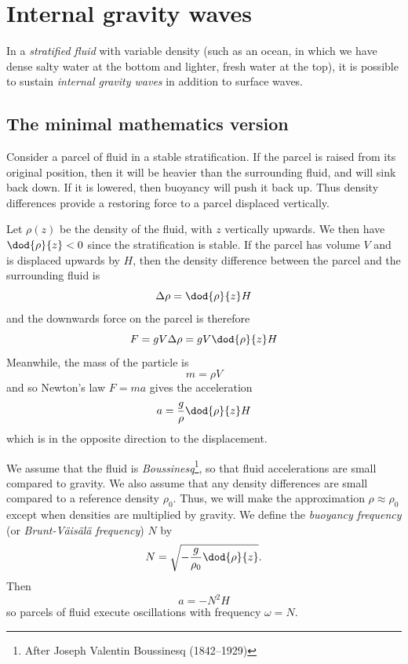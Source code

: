 \newpage
\chapter{Internal gravity waves} \label{section1}

In a \textit{stratified fluid} with variable density (such as an ocean, in which
we have dense salty water at the bottom and lighter, fresh water at the top), it
is possible to sustain \textit{internal gravity waves} in addition to surface
waves.

\section{The minimal mathematics version}

Consider a parcel of fluid in a stable stratification. If the parcel is raised
from its original position, then it will be heavier than the surrounding fluid,
and will sink back down. If it is lowered, then buoyancy will push it back up.
Thus density differences provide a restoring force to a parcel displaced
vertically. 

Let $\rho(z)$ be the density of the fluid, with $z$ vertically upwards. We then
have $\dod{\rho}{z} < 0$ since the stratification is stable. If the parcel has
volume $V$ and is displaced upwards by $H$, then the density difference between
the parcel and the surrounding fluid is 
\begin{equation}
	\Delta\rho = \dod{\rho}{z} H
\end{equation}
and the downwards force on the parcel is therefore
\begin{equation}
	F = gV\Delta\rho = gV\dod{\rho}{z}H
\end{equation}
Meanwhile, the mass of the particle is 
\begin{equation}
	m = \rho V
\end{equation}
and so Newton's law $F = ma$ gives the acceleration
\begin{equation}
	a = \frac{g}{\rho}\dod{\rho}{z} H
\end{equation}
which is in the opposite direction to the displacement.

We assume that the fluid is \textit{Boussinesq}\footnote{After Joseph Valentin
Boussinesq (1842--1929)}, so that fluid accelerations are
small compared to gravity. We also assume that any density differences are small
compared to a reference density $\rho_0$. Thus, we will make the approximation
$\rho\approx\rho_0$ except when densities are multiplied by gravity. We define
the \textit{buoyancy frequency} (or \textit{Brunt-V\"ais\"al\"a frequency}) $N$
by
\begin{equation}
    N = \sqrt{-\frac{g}{\rho_0}\dod{\rho}{z}}.
\end{equation}
Then 
\begin{equation}
	a = -N^2 H
\end{equation}
so parcels of fluid execute oscillations with frequency $\omega = N$.

